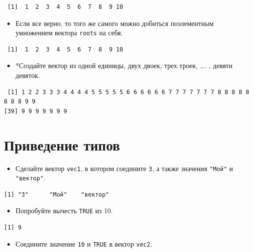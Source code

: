 \documentclass[
]{book}
\providecommand{\tightlist}{%
  \setlength{\itemsep}{0pt}\setlength{\parskip}{0pt}}
\begin{document}
\begin{verbatim}
 [1]  1  2  3  4  5  6  7  8  9 10
\end{verbatim}

\begin{itemize}
\tightlist
\item
  Если все верно, то того же самого можно добиться поэлементным умножением вектора \texttt{roots} на себя.
\end{itemize}

\begin{verbatim}
 [1]  1  2  3  4  5  6  7  8  9 10
\end{verbatim}

\begin{itemize}
\tightlist
\item
  *Создайте вектор из одной единицы, двух двоек, трех троек, \ldots. , девяти девяток.
\end{itemize}

\begin{verbatim}
 [1] 1 2 2 3 3 3 4 4 4 4 5 5 5 5 5 6 6 6 6 6 6 7 7 7 7 7 7 7 8 8 8 8 8 8 8 8 9 9
[39] 9 9 9 9 9 9 9
\end{verbatim}

\hypertarget{task_coer}{%
\section{Приведение типов}\label{task_coer}}

\begin{itemize}
\tightlist
\item
  Сделайте вектор \texttt{vec1}, в котором соедините \texttt{3}, а также значения \texttt{"Мой"} и \texttt{"вектор"}.
\end{itemize}

\begin{verbatim}
[1] "3"      "Мой"    "вектор"
\end{verbatim}

\begin{itemize}
\tightlist
\item
  Попробуйте вычесть \texttt{TRUE} из 10.
\end{itemize}

\begin{verbatim}
[1] 9
\end{verbatim}

\begin{itemize}
\tightlist
\item
  Соедините значение \texttt{10} и \texttt{TRUE} в вектор \texttt{vec2}.
\end{itemize}
\end{document}
